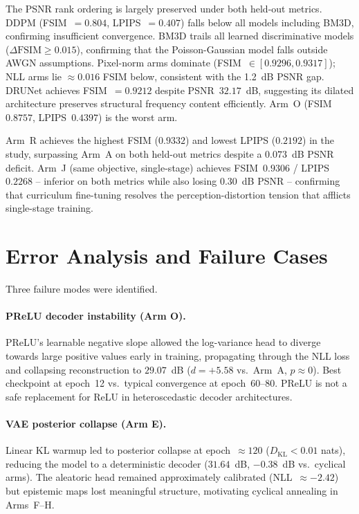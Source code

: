 \documentclass[12pt, a4paper, twoside, openright]{book}
\begin{document}
The PSNR rank ordering is largely preserved under both held-out metrics. DDPM (FSIM~$=0.804$, LPIPS~$=0.407$) falls below all models including BM3D, confirming insufficient convergence. BM3D trails all learned discriminative models ($\Delta\mathrm{FSIM}\geq0.015$), confirming that the Poisson-Gaussian model falls outside AWGN assumptions. Pixel-norm arms dominate (FSIM~$\in[0.9296,0.9317]$); NLL arms lie $\approx0.016$ FSIM below, consistent with the 1.2~dB PSNR gap. DRUNet achieves FSIM~$=0.9212$ despite PSNR~$32.17$~dB, suggesting its dilated architecture preserves structural frequency content efficiently. Arm~O (FSIM~$0.8757$, LPIPS~$0.4397$) is the worst arm.

Arm~R achieves the highest FSIM ($0.9332$) and lowest LPIPS ($0.2192$) in the study, surpassing Arm~A on both held-out metrics despite a $0.073$~dB PSNR deficit. Arm~J (same objective, single-stage) achieves FSIM~$0.9306$ / LPIPS~$0.2268$ -- inferior on both metrics while also losing $0.30$~dB PSNR -- confirming that curriculum fine-tuning resolves the perception-distortion tension that afflicts single-stage training.

\section{Error Analysis and Failure Cases}
\label{sec:results:error}

Three failure modes were identified.

\paragraph{PReLU decoder instability (Arm O).}
PReLU's learnable negative slope allowed the log-variance head to diverge towards large positive values early in training, propagating through the NLL loss and collapsing reconstruction to $29.07$~dB ($d=+5.58$ vs.\ Arm~A, $p\approx0$). Best checkpoint at epoch~12 vs.\ typical convergence at epoch~60--80. PReLU is not a safe replacement for ReLU in heteroscedastic decoder architectures.

\paragraph{VAE posterior collapse (Arm E).}
Linear KL warmup led to posterior collapse at epoch~$\approx120$ ($D_\mathrm{KL}<0.01$ nats), reducing the model to a deterministic decoder ($31.64$~dB, $-0.38$~dB vs.\ cyclical arms). The aleatoric head remained approximately calibrated (NLL~$\approx-2.42$) but epistemic maps lost meaningful structure, motivating cyclical annealing in Arms~F--H.
\end{document}
